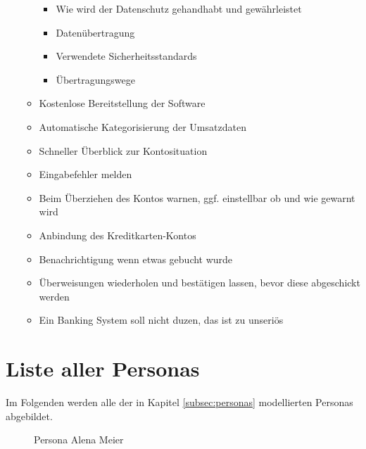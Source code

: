 \begin{enumerate}
\begin{itemize}
\begin{itemize}
        \item Wie wird der Datenschutz gehandhabt und gewährleistet
        \item Datenübertragung
        \item Verwendete Sicherheitsstandards
        \item Übertragungswege
    \end{itemize}
    \item Kostenlose Bereitstellung der Software
    \item Automatische Kategorisierung der Umsatzdaten
    \item Schneller Überblick zur Kontosituation
    \item Eingabefehler melden
    \item Beim Überziehen des Kontos warnen, ggf. einstellbar ob und wie gewarnt wird
    \item Anbindung des Kreditkarten-Kontos
    \item Benachrichtigung wenn etwas gebucht wurde
    \item Überweisungen wiederholen und bestätigen lassen, bevor diese abgeschickt werden
    \item Ein Banking System soll nicht duzen, das ist zu unseriös
    \end{itemize}
\end{enumerate}

\section{Liste aller Personas}
\label{sec:anhang-personas}
Im Folgenden werden alle der in Kapitel \ref{subsec:personas} modellierten Personas abgebildet. 

\begin{figure}[!htb]
    \centering
    \caption{Persona Alena Meier}
    \label{fig:alena-meier-anhang}
\end{figure}

